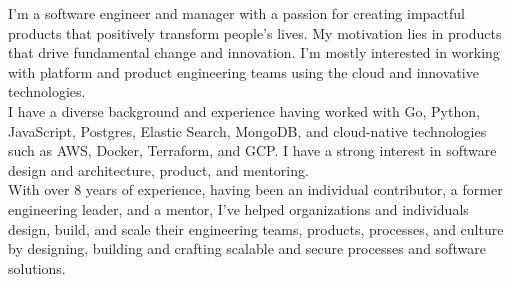 \documentclass[9pt]{developercv} %
\begin{document}


\begin{minipage}[t]{1\textwidth} %
    {  
        I'm a software engineer and manager with a passion for creating impactful products 
        that positively transform people's lives. My motivation lies in products that drive fundamental 
        change and innovation. I'm mostly interested in working with platform and product engineering 
        teams using the cloud and innovative technologies. \\

        I have a diverse background and experience having worked with Go, Python, JavaScript, Postgres, 
        Elastic Search, MongoDB, and cloud-native technologies such as AWS, Docker, Terraform, and 
        GCP. I have a strong interest in software design and architecture, product, and mentoring. \\ 
    
        With over 8 years of experience, having been an individual contributor, a former engineering 
        leader, and a mentor, I've helped organizations and individuals design, build, and scale 
        their engineering teams, products, processes, and culture by designing, building and crafting 
        scalable and secure processes and software solutions. 
    }
\end{minipage}



\end{document}
